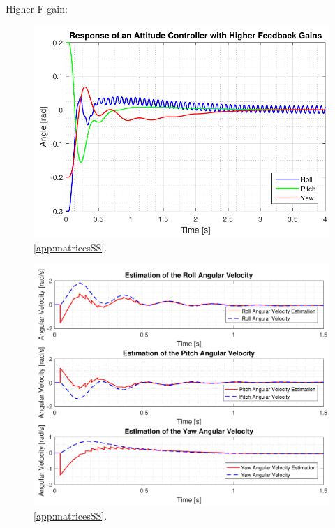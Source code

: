 
Higher F gain:

\begin{figure}[H]
	\centering
	\includegraphics[scale=1]{figures/ssEqBad.pdf}
	\caption{\autoref{app:matricesSS}.}
	\label{fig:TranslationalControlDiagram}
\end{figure}

\begin{figure}[H]
	\centering
	\includegraphics[scale=1]{figures/ssObsFinal.pdf}
	\caption{\autoref{app:matricesSS}.}
	\label{fig:TranslationalControlDiagram}
\end{figure}

